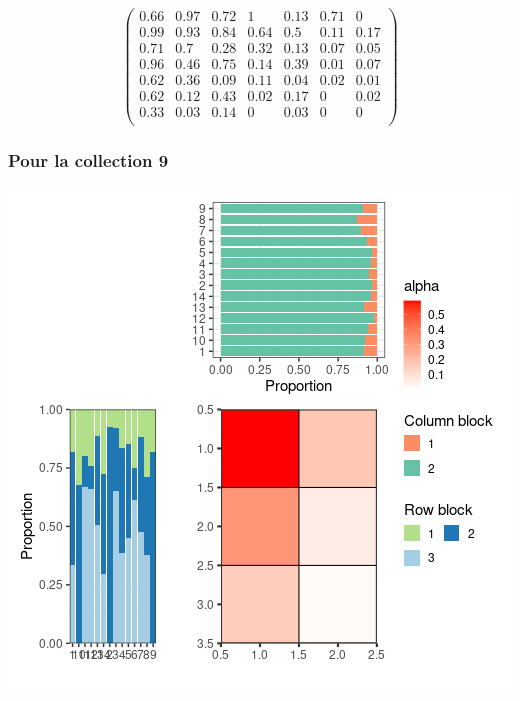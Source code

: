 \normalsize\newline\[\begin{pmatrix} 0.66 &0.97 &0.72 &1 &0.13 &0.71 &0 \\0.99 &0.93 &0.84 &0.64 &0.5 &0.11 &0.17 \\0.71 &0.7 &0.28 &0.32 &0.13 &0.07 &0.05 \\0.96 &0.46 &0.75 &0.14 &0.39 &0.01 &0.07 \\0.62 &0.36 &0.09 &0.11 &0.04 &0.02 &0.01 \\0.62 &0.12 &0.43 &0.02 &0.17 &0 &0.02 \\0.33 &0.03 &0.14 &0 &0.03 &0 &0 \\ \end{pmatrix}\]

\subsubsection{Pour la collection 9 }

\includegraphics{./img/01cf8becd8b4fa7e13437d68ce7a48e6365fc5d8.png}\newline \tiny

